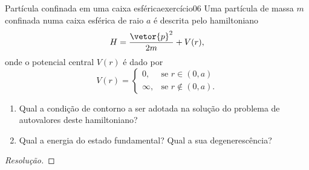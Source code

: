 \begin{exercício}{Partícula confinada em uma caixa esférica}{exercício06}
    Uma partícula de massa \(m\) confinada numa caixa esférica de raio \(a\) é descrita pelo hamiltoniano
    \begin{equation*}
        H = \frac{\vetor{p}^2}{2m} + V(r),
    \end{equation*}
    onde o potencial central \(V(r)\) é dado por
    \begin{equation*}
        V(r) = \begin{cases}
            0, &\text{se } r \in (0,a)\\
            \infty, &\text{se }r \notin (0,a).
        \end{cases}
    \end{equation*}
    \begin{enumerate}[label=(\alph*)]
        \item Qual a condição de contorno a ser adotada na solução do problema de autovalores deste hamiltoniano?
        \item Qual a energia do estado fundamental? Qual a sua degenerescência?
    \end{enumerate}
\end{exercício}
\begin{proof}[Resolução]

\end{proof}
